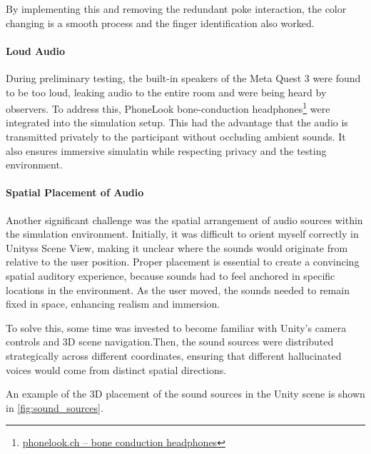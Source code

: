 By implementing this and removing the redundant poke interaction, the color changing is a smooth process and the finger identification also worked.

\paragraph{Loud Audio} 
During preliminary testing, the built-in speakers of the Meta Quest 3 were found to be too loud, leaking audio to the entire room and were being heard by observers. To address this, PhoneLook bone-conduction headphones\footnote{\href{https://www.phonelook.ch/de/stylische-kabellose-bluetooth-knochenleitungs-kopfhorer-fur-sport-laufen-radfahren-fitness-schwarz.html}{phonelook.ch – bone conduction headphones}} were integrated into the simulation setup. This had the advantage that the audio is transmitted privately to the participant without occluding ambient sounds.
It also ensures immersive simulatin while respecting privacy and the testing environment.

\paragraph{Spatial Placement of Audio } 
Another significant challenge was the spatial arrangement of audio sources within the simulation environment. Initially, it was difficult to orient myself correctly in Unityss Scene View, making it unclear where the sounds would originate from relative to the user position. Proper placement is essential to create a convincing spatial auditory experience, because sounds had to feel anchored in specific locations in the environment. As the user moved, the sounds needed to remain fixed in space, enhancing realism and immersion.

\vspace{1em}

To solve this, some time was invested to become familiar with Unity's camera controls and 3D scene navigation.Then, the sound sources were distributed strategically across different coordinates, ensuring that different hallucinated voices would come from distinct spatial directions.

\vspace{1em}

An example of the 3D placement of the sound sources in the Unity scene is shown in \autoref{fig:sound_sources}.

